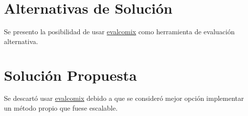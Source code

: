 \section{Alternativas de Solución}
Se presento la posibilidad de usar \href{http://evalcomix.uca.es/}{evalcomix} como herramienta de evaluación alternativa.

\section{Solución Propuesta}
Se descartó usar \href{http://evalcomix.uca.es/}{evalcomix} debido a que se consideró mejor opción implementar un método propio que fuese escalable.
